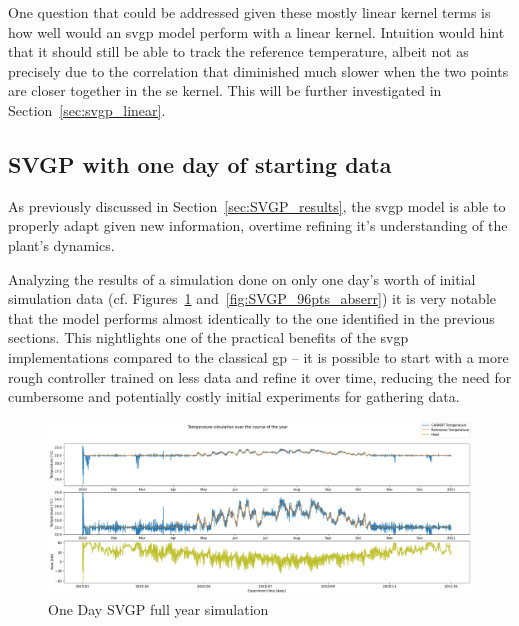 One question that could be addressed given these mostly linear kernel terms is
how well would an \acrshort{svgp} model perform with a linear kernel.
Intuition would hint that it should still be able to track the reference
temperature, albeit not as precisely due to the correlation that diminished much
slower when the two points are closer together in the \acrshort{se} kernel. This
will be further investigated in Section~\ref{sec:svgp_linear}.

\clearpage

\subsection{SVGP with one day of starting data}\label{sec:svgp_96pts}

As previously discussed in Section~\ref{sec:SVGP_results}, the \acrshort{svgp}
model is able to properly adapt given new information, overtime refining it's
understanding of the plant's dynamics.

Analyzing the results of a simulation done on only one day's worth of initial
simulation data (cf. Figures~\ref{fig:SVGP_96pts_fullyear_simulation}
and~\ref{fig:SVGP_96pts_abserr}) it is very notable that the model performs
almost identically to the one identified in the previous sections. This
nightlights one of the practical benefits of the \acrshort{svgp} implementations
compared to the classical \acrlong{gp} -- it is possible to start with a more
rough controller trained on less data and refine it over time, reducing the need
for cumbersome and potentially costly initial experiments for gathering data.

\begin{figure}[ht]
    \centering
    \includegraphics[width =
    \textwidth]{Plots/6_SVGP_96pts_inf_window_12_averageYear_fullyear.pdf}
    \caption{One Day SVGP full year simulation}
    \label{fig:SVGP_96pts_fullyear_simulation}
\end{figure}

